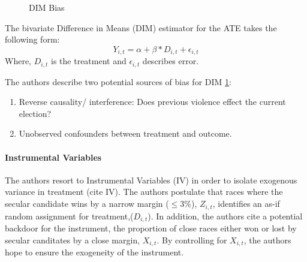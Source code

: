 \documentclass{scrartcl}
\begin{document}
\begin{figure}[h]
  \centering
  \caption{DIM Bias}
  \label{fig:ate_dim}
\end{figure}

The bivariate Difference in Means (DIM) estimator for the ATE takes the following form: 
\begin{equation} \label{eq:1}
  Y_{i,t} = \alpha + \beta * D_{i,t} + \epsilon_{i,t}
\end{equation}
Where, $D_{i,t}$ is the treatment and $\epsilon_{i,t}$ describes error.

The authors describe two potential sources of bias for DIM \ref{fig:ate_dim}:

\begin{enumerate}
\item Reverse causality/ interference: Does previous violence effect the current election?
\item Unobserved confounders between treatment and outcome.
\end{enumerate}

\paragraph{Instrumental Variables} \label{iv}

The authors resort to Instrumental Variables (IV) in order to isolate exogenous variance in treatment (cite IV).
The authors postulate that races where the secular candidate wins by a narrow margin ($\leq 3 \%$), $Z_{i,t}$, identifies an as-if random assignment for treatment,($D_{i,t}$).
In addition, the authors cite a potential backdoor for the instrument, the proportion of close races either won or lost by secular canditates by a close margin, $X_{i,t}$.
By controlling for $X_{i,t}$, the authors hope to ensure the exogeneity of the instrument.
\end{document}
